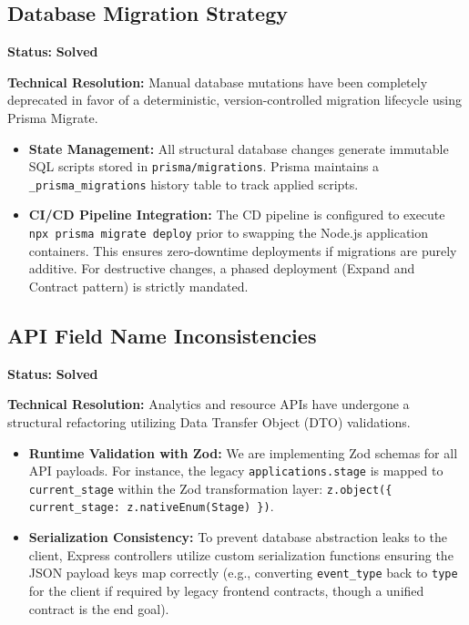 \documentclass[12pt, a4paper]{article}
\begin{document}
\subsection{Database Migration Strategy}
\textbf{Status:} \textcolor{solved}{\textbf{Solved}}

\textbf{Technical Resolution:}
Manual database mutations have been completely deprecated in favor of a deterministic, version-controlled migration lifecycle using Prisma Migrate.
\begin{itemize}
    \item \textbf{State Management:} All structural database changes generate immutable SQL scripts stored in \texttt{prisma/migrations}. Prisma maintains a \texttt{\_prisma\_migrations} history table to track applied scripts.
    \item \textbf{CI/CD Pipeline Integration:} The CD pipeline is configured to execute \texttt{npx prisma migrate deploy} prior to swapping the Node.js application containers. This ensures zero-downtime deployments if migrations are purely additive. For destructive changes, a phased deployment (Expand and Contract pattern) is strictly mandated.
\end{itemize}

\subsection{API Field Name Inconsistencies}
\textbf{Status:} \textcolor{solved}{\textbf{Solved}}

\textbf{Technical Resolution:}
Analytics and resource APIs have undergone a structural refactoring utilizing Data Transfer Object (DTO) validations.
\begin{itemize}
    \item \textbf{Runtime Validation with Zod:} We are implementing Zod schemas for all API payloads. For instance, the legacy \texttt{applications.stage} is mapped to \texttt{current\_stage} within the Zod transformation layer: \texttt{z.object(\{ current\_stage: z.nativeEnum(Stage) \})}.
    \item \textbf{Serialization Consistency:} To prevent database abstraction leaks to the client, Express controllers utilize custom serialization functions ensuring the JSON payload keys map correctly (e.g., converting \texttt{event\_type} back to \texttt{type} for the client if required by legacy frontend contracts, though a unified contract is the end goal).
\end{itemize}
\end{document}
